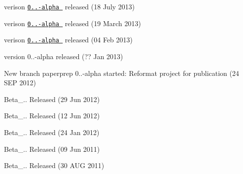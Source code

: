 
\begin{DoxyItemize}
\item verison \href{/share/MD0_DATA/Web/nonadmd/nonadmd-0.1.44-alpha.tar.gz}{\tt 0..-\/alpha } released (18 July 2013)
\item verison \href{/share/MD0_DATA/Web/nonadmd/nonadmd-0.1.4-alpha.tar.gz}{\tt 0..-\/alpha } released (19 March 2013)
\item verison \href{/share/MD0_DATA/Web/nonadmd/nonadmd-0.1.3-alpha.tar.gz}{\tt 0..-\/alpha } released (04 Feb 2013)
\item version 0..-\/alpha released (?? Jan 2013)
\item New branch paperprep 0..-\/alpha started\+: Reformat project for publication (24 S\+E\+P 2012)
\item Beta\+\_.. Released (29 Jun 2012)
\item Beta\+\_.. Released (12 Jun 2012)
\item Beta\+\_.. Released (24 Jan 2012)
\item Beta\+\_.. Released (09 Jun 2011)
\item Beta\+\_.. Released (30 A\+U\+G 2011) 
\end{DoxyItemize}